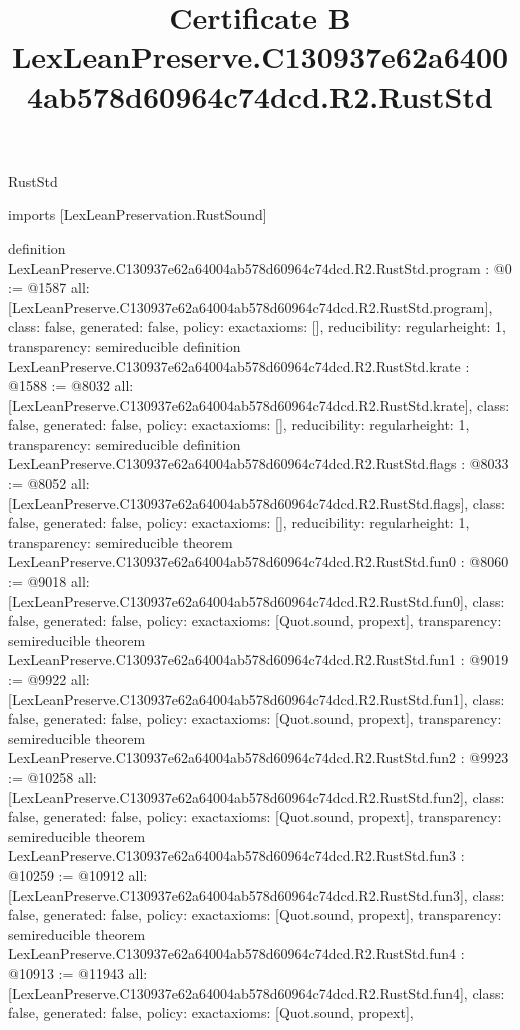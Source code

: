 \begin{lexlean}{RustStd}
\title{Certificate B LexLeanPreserve.C130937e62a64004ab578d60964c74dcd.R2.RustStd}
\begin{coremodule}
imports [LexLeanPreservation.RustSound]

definition LexLeanPreserve.C130937e62a64004ab578d60964c74dcd.R2.RustStd.program : @0 := @1587 {
  all: [LexLeanPreserve.C130937e62a64004ab578d60964c74dcd.R2.RustStd.program],
  class: false,
  generated: false,
  policy: exact{axioms: []},
  reducibility: regular{height: 1},
  transparency: semireducible
}
definition LexLeanPreserve.C130937e62a64004ab578d60964c74dcd.R2.RustStd.krate : @1588 := @8032 {
  all: [LexLeanPreserve.C130937e62a64004ab578d60964c74dcd.R2.RustStd.krate],
  class: false,
  generated: false,
  policy: exact{axioms: []},
  reducibility: regular{height: 1},
  transparency: semireducible
}
definition LexLeanPreserve.C130937e62a64004ab578d60964c74dcd.R2.RustStd.flags : @8033 := @8052 {
  all: [LexLeanPreserve.C130937e62a64004ab578d60964c74dcd.R2.RustStd.flags],
  class: false,
  generated: false,
  policy: exact{axioms: []},
  reducibility: regular{height: 1},
  transparency: semireducible
}
theorem LexLeanPreserve.C130937e62a64004ab578d60964c74dcd.R2.RustStd.fun0 : @8060 := @9018 {
  all: [LexLeanPreserve.C130937e62a64004ab578d60964c74dcd.R2.RustStd.fun0],
  class: false,
  generated: false,
  policy: exact{axioms: [Quot.sound, propext]},
  transparency: semireducible
}
theorem LexLeanPreserve.C130937e62a64004ab578d60964c74dcd.R2.RustStd.fun1 : @9019 := @9922 {
  all: [LexLeanPreserve.C130937e62a64004ab578d60964c74dcd.R2.RustStd.fun1],
  class: false,
  generated: false,
  policy: exact{axioms: [Quot.sound, propext]},
  transparency: semireducible
}
theorem LexLeanPreserve.C130937e62a64004ab578d60964c74dcd.R2.RustStd.fun2 : @9923 := @10258 {
  all: [LexLeanPreserve.C130937e62a64004ab578d60964c74dcd.R2.RustStd.fun2],
  class: false,
  generated: false,
  policy: exact{axioms: [Quot.sound, propext]},
  transparency: semireducible
}
theorem LexLeanPreserve.C130937e62a64004ab578d60964c74dcd.R2.RustStd.fun3 : @10259 := @10912 {
  all: [LexLeanPreserve.C130937e62a64004ab578d60964c74dcd.R2.RustStd.fun3],
  class: false,
  generated: false,
  policy: exact{axioms: [Quot.sound, propext]},
  transparency: semireducible
}
theorem LexLeanPreserve.C130937e62a64004ab578d60964c74dcd.R2.RustStd.fun4 : @10913 := @11943 {
  all: [LexLeanPreserve.C130937e62a64004ab578d60964c74dcd.R2.RustStd.fun4],
  class: false,
  generated: false,
  policy: exact{axioms: [Quot.sound, propext]},
}
\end{coremodule}
\end{lexlean}
